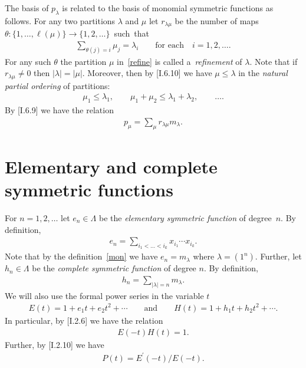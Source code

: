 \documentclass[11pt]{article}
\numberwithin{equation}{section}
\renewcommand\le{\leqslant}
\begin{document}
The basis of $p_\lambda$ is related to the basis of monomial symmetric functions as follows.
For any two partitions $\lambda$ and $\mu$ let $r_{\lambda\mu}$ be the number of maps
$\theta:\{1,\ldots,\ell(\mu)\}\to\{1,2,\ldots\}$~such~that
\begin{gather}
\label{refine}
\sum_{\theta(j)=i}\mu_j=\lambda_i
\qquad
\text{for each}
\quad
i=1,2,\ldots.
\end{gather}
For any such $\theta$ the partition $\mu$ in~\eqref{refine} is called a~\textit{refinement} of $\lambda$.
Note that if $r_{\lambda\mu}\neq0$ then $|\lambda|=|\mu|$.
Moreover, then by [I.6.10] we have $\mu\le\lambda$ in the \textit{natural partial ordering} of partitions:
\begin{gather*}
\mu_1\le\lambda_1,\qquad \mu_1+\mu_2\le\lambda_1+\lambda_2,\qquad \ldots.
\end{gather*}
By [I.6.9] we have the relation
\begin{gather}\label{pm}
p_\mu=\sum_\mu r_{\lambda\mu}m_\lambda.
\end{gather}

\section{Elementary and complete symmetric functions}\label{Section4}

For $n=1,2,\ldots$ let $e_n\in\Lambda$ be the \textit{elementary symmetric function} of degree~$n$.
By def\/inition,
\begin{gather*}
e_n=\sum_{i_1<\dots<i_k}x_{i_1}\cdots x_{i_k}.
\end{gather*}
Note that by the def\/inition~\eqref{mon} we have $e_n=m_\lambda$ where $\lambda=(1^n)$.
Further, let $h_n\in\Lambda$ be the \textit{complete symmetric function} of degree $n$.
By def\/inition,
\begin{gather*}
h_n=\sum_{|\lambda|=n}m_\lambda.
\end{gather*}
We will also use the formal power series in the variable $t$
\begin{gather*}
E(t)=1+e_1t+e_2t^2+\cdots
\qquad
\text{and}
\qquad
H(t)=1+h_1t+h_2t^2+\cdots.
\end{gather*}
In particular, by [I.2.6] we have the relation
\begin{gather}
\label{eh}
E(-t)H(t)=1.
\end{gather}
Further, by [I.2.10] we have
\begin{gather}
\label{hep}
P(t)=E^{\prime}(-t)/E(-t).
\end{gather}
\end{document}
